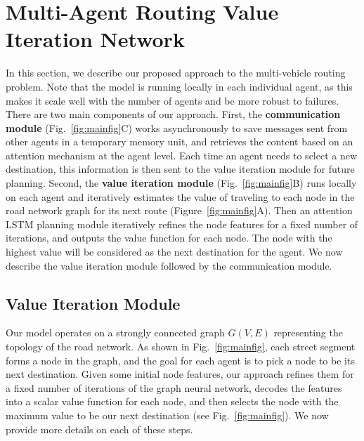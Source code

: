 \section{Multi-Agent Routing Value Iteration Network}

In this section, we describe our proposed approach to the multi-vehicle routing problem. Note that the model is running locally in each individual agent,
as this makes it scale well with the number of agents and be more robust to failures. There are two
main components of our approach.  First, the \textbf{communication module} (Fig.~\ref{fig:mainfig}C) works asynchronously to save
messages sent from other agents in a temporary memory unit, and retrieves the content based on an
attention mechanism at the agent level.
Each time an agent needs to select a new destination,
this information is then sent to the value iteration module for
future planning. Second, the \textbf{value iteration module} (Fig.~\ref{fig:mainfig}B)
runs locally on each agent
and iteratively estimates the value of traveling to each node in the
road network graph for its next route
(Figure~\ref{fig:mainfig}A).
Then an attention LSTM planning module iteratively refines the node
features for a fixed number of iterations, and outputs the value function for each node. The node
with the highest value will be considered as the next destination for the agent. We now describe the
value iteration module followed by the communication module.



\subsection{Value Iteration Module}
Our model operates on a strongly connected graph $G(V,E)$ representing the topology of the road
network. As shown in Fig.~\ref{fig:mainfig}, each street segment forms a node in the graph, and the goal for
each agent is to pick a node to be its next destination. %
Given some
initial node features, our approach refines them for a fixed
number of  iterations of the graph neural network,  decodes the features into a scalar value function for
each node, and then selects the node with the maximum value to be our next destination (see
Fig.~\ref{fig:mainfig}). We now provide more details on each of these steps.


